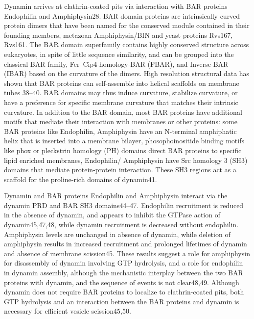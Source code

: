 \vspace{5mm}
Dynamin arrives at clathrin-coated pits via interaction with BAR proteins Endophilin and Amphiphysin28. BAR domain proteins are intrinsically curved protein dimers that have been named for the conserved module contained in their founding members, metazoan Amphiphysin/BIN and yeast proteins Rvs167, Rvs161. The BAR domain superfamily contains highly conserved structure across eukaryotes, in spite of little sequence similarity, and can be grouped into the classical BAR family, Fer–Cip4-homology-BAR (FBAR), and Inverse-BAR (IBAR) based on the curvature of the dimers. High resolution structural data has shown that BAR proteins can self-assemble into helical scaffolds on membrane tubes 38–40. BAR domains may thus induce curvature, stabilize curvature, or have a preference for specific membrane curvature that matches their intrinsic curvature. In addition to the BAR domain, most BAR proteins have additional motifs that mediate their interaction with membranes or other proteins: some BAR proteins like Endophilin, Amphiphysin have an N-terminal amphiphatic helix that is inserted into a membrane bilayer, phosophoinositide binding motifs like phox or pleckstrin homology (PH) domains direct BAR proteins to specific lipid enriched membranes, Endophilin/ Amphiphysin have Src homology 3 (SH3) domains that mediate protein-protein interaction. These SH3 regions act as a scaffold for the proline-rich domains of dynamin41. 

\vspace{5mm}
Dynamin and BAR proteins Endophilin and Amphiphysin interact via the dynamin PRD and BAR SH3 domains44–47. Endophilin recruitment is reduced in the absence of dynamin, and appears to inhibit the GTPase action of dynamin45,47,48, while dynamin recruitment is decreased without endophilin. Amphiphysin levels are unchanged in absence of dynamin, while deletion of amphiphysin results in increased recruitment and prolonged lifetimes of dynamin and absence of membrane scission45. These results suggest a role for amphiphysin for disassembly of dynamin involving GTP hydrolysis, and a role for endophilin in dynamin assembly, although the mechanistic interplay between the two BAR proteins with dynamin, and the sequence of events is not clear48,49. Although dynamin does not require BAR proteins to localize to clathrin-coated pits, both GTP hydrolysis and an interaction between the BAR proteins and dynamin is necessary for efficient vesicle scission45,50.





